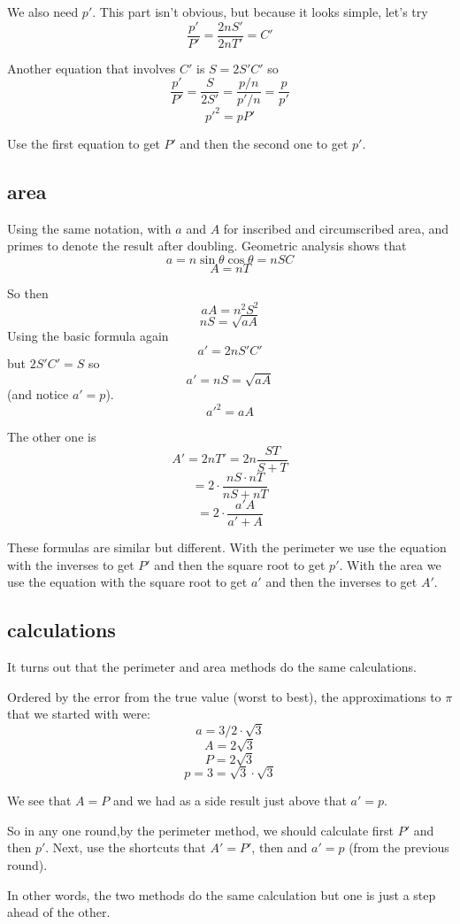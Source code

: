 \documentclass[11pt, oneside]{article}
\begin{document}
We also need $p'$.  This part isn't obvious, but because it looks simple, let's try
\[ \frac{p'}{P'} = \frac{2nS'}{2nT'} =  C' \]

Another equation that involves $C'$ is $S=2S'C'$ so
\[ \frac{p'}{P'} = \frac{S}{2S'} = \frac{p/n}{p'/n} = \frac{p}{p'} \]
\[ p'^2 = pP' \]

Use the first equation to get $P'$ and then the second one to get $p'$.

\subsection*{area}

Using the same notation, with $a$ and $A$ for inscribed and circumscribed area, and primes to denote the result after doubling.  Geometric analysis shows that
\[ a = n \sin \theta \cos \theta = nSC \]
\[ A = nT \]

So then
\[ aA = n^2 S^2 \]
\[ nS = \sqrt{aA} \]
Using the basic formula again
\[ a' = 2nS'C' \]
but $2S'C' = S$ so
\[ a' = nS = \sqrt{aA} \]
(and notice $a' = p$).
\[ a'^2 = aA \]

The other one is 
\[ A' = 2nT' = 2n \frac{ST}{S + T} \]
\[ = 2 \cdot \frac{nS \cdot nT}{nS + nT} \]
\[ = 2 \cdot \frac{a'A}{a' + A} \]

These formulas are similar but different.  With the perimeter we use the equation with the inverses to get $P'$ and then the square root to get $p'$.  With the area we use the equation with the square root to get $a'$ and then the inverses to get $A'$.

\subsection*{calculations}

It turns out that the perimeter and area methods do the same calculations.

Ordered by the error from the true value (worst to best), the approximations to $\pi$ that we started with were:
\[ a = 3/2 \cdot \sqrt{3} \]
\[ A = 2 \sqrt{3} \]
\[ P = 2 \sqrt{3} \]
\[ p = 3 = \sqrt{3} \cdot \sqrt{3} \]

We see that $A = P$ and we had as a side result just above that $a' = p$.

So in any one round,by the perimeter method, we should calculate first $P'$ and then $p'$.  Next, use the shortcuts that $A' = P'$, then and $a' = p$ (from the previous round).

In other words, the two methods do the same calculation but one is just a step ahead of the other.
\end{document}
